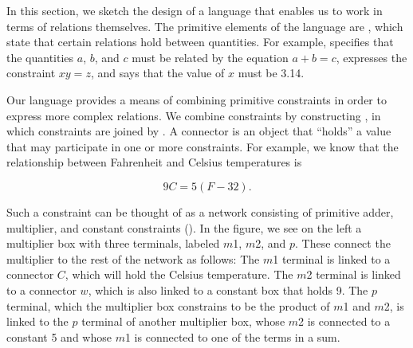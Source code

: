 In this section, we sketch the design of a language that enables us to work in
terms of relations themselves.  The primitive elements of the language are
, which state that certain relations hold
between quantities.  For example,  specifies that the
quantities \( a \), \( b \), and \( c \) must be related by the equation
\( a + b = c \),  expresses the constraint
\( xy = z \), and  says that the value of \( x \) must be 3.14.

Our language provides a means of combining primitive constraints in order to
express more complex relations.  We combine constraints by constructing
, in which constraints are joined by
.  A connector is an object that ``holds'' a value that may
participate in one or more constraints.  For example, we know that the
relationship between Fahrenheit and Celsius temperatures is
\begin{comment}

\begin{example}
9C = 5(F - 32)
\end{example}

\end{comment}

$$ 9C = 5(F - 32). $$

Such a constraint can be thought of as a network consisting of primitive adder,
multiplier, and constant constraints ().  In the figure, we
see on the left a multiplier box with three terminals, labeled \( m \)1, \( m \)2,
and \( p \).  These connect the multiplier to the rest of the network as follows:
The \( m \)1 terminal is linked to a connector \( C \), which will hold the Celsius
temperature.  The \( m \)2 terminal is linked to a connector \( w \), which is also
linked to a constant box that holds 9.  The \( p \) terminal, which the
multiplier box constrains to be the product of \( m \)1 and \( m \)2, is linked to
the \( p \) terminal of another multiplier box, whose \( m \)2 is connected to a
constant 5 and whose \( m \)1 is connected to one of the terms in a sum.

